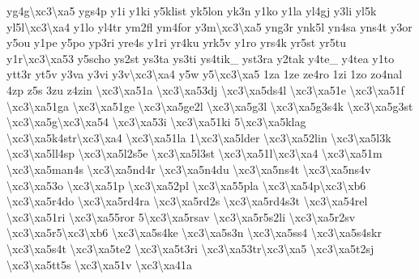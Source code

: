 \begin{DoxyCompactItemize}
yg4g\textbackslash{}xc3\textbackslash{}xa5 ygs4p y1i y1ki y5klist yk5lon yk3n y1ko y1la yl4gj y3li yl5k yl5l\textbackslash{}xc3\textbackslash{}xa4 y1lo yl4tr ym2fl ym4for y3m\textbackslash{}xc3\textbackslash{}xa5 yng3r ynk5l yn4sa yns4t y3or y5ou y1pe y5po yp3ri yre4s y1ri yr4ku yrk5v y1ro yrs4k yr5st yr5tu y1r\textbackslash{}xc3\textbackslash{}xa53 y5scho ys2st ys3ta ys3ti ys4tik\-\_\- yst3ra y2tak y4te\-\_\- y4tea y1to ytt3r yt5v y3va y3vi y3v\textbackslash{}xc3\textbackslash{}xa4 y5w y5\textbackslash{}xc3\textbackslash{}xa5 1za 1ze ze4ro 1zi 1zo zo4nal 4zp z5s 3zu z4zin \textbackslash{}xc3\textbackslash{}xa51a \textbackslash{}xc3\textbackslash{}xa53dj \textbackslash{}xc3\textbackslash{}xa5ds4l \textbackslash{}xc3\textbackslash{}xa51e \textbackslash{}xc3\textbackslash{}xa51f \textbackslash{}xc3\textbackslash{}xa51ga \textbackslash{}xc3\textbackslash{}xa51ge \textbackslash{}xc3\textbackslash{}xa5ge2l \textbackslash{}xc3\textbackslash{}xa5g3l \textbackslash{}xc3\textbackslash{}xa5g3s4k \textbackslash{}xc3\textbackslash{}xa5g3st \textbackslash{}xc3\textbackslash{}xa5g\textbackslash{}xc3\textbackslash{}xa54 \textbackslash{}xc3\textbackslash{}xa53i \textbackslash{}xc3\textbackslash{}xa51ki 5\textbackslash{}xc3\textbackslash{}xa5klag \textbackslash{}xc3\textbackslash{}xa5k4str\textbackslash{}xc3\textbackslash{}xa4 \textbackslash{}xc3\textbackslash{}xa51la 1\textbackslash{}xc3\textbackslash{}xa5lder \textbackslash{}xc3\textbackslash{}xa52lin \textbackslash{}xc3\textbackslash{}xa5l3k \textbackslash{}xc3\textbackslash{}xa5ll4sp \textbackslash{}xc3\textbackslash{}xa5l2s5e \textbackslash{}xc3\textbackslash{}xa5l3st \textbackslash{}xc3\textbackslash{}xa51l\textbackslash{}xc3\textbackslash{}xa4 \textbackslash{}xc3\textbackslash{}xa51m \textbackslash{}xc3\textbackslash{}xa5man4s \textbackslash{}xc3\textbackslash{}xa5nd4r \textbackslash{}xc3\textbackslash{}xa5n4du \textbackslash{}xc3\textbackslash{}xa5ns4t \textbackslash{}xc3\textbackslash{}xa5ns4v \textbackslash{}xc3\textbackslash{}xa53o \textbackslash{}xc3\textbackslash{}xa51p \textbackslash{}xc3\textbackslash{}xa52pl \textbackslash{}xc3\textbackslash{}xa55pla \textbackslash{}xc3\textbackslash{}xa54p\textbackslash{}xc3\textbackslash{}xb6 \textbackslash{}xc3\textbackslash{}xa5r4do \textbackslash{}xc3\textbackslash{}xa5rd4ra \textbackslash{}xc3\textbackslash{}xa5rd2s \textbackslash{}xc3\textbackslash{}xa5rd4s3t \textbackslash{}xc3\textbackslash{}xa54rel \textbackslash{}xc3\textbackslash{}xa51ri \textbackslash{}xc3\textbackslash{}xa55ror 5\textbackslash{}xc3\textbackslash{}xa5rsav \textbackslash{}xc3\textbackslash{}xa5r5s2li \textbackslash{}xc3\textbackslash{}xa5r2sv \textbackslash{}xc3\textbackslash{}xa5r5\textbackslash{}xc3\textbackslash{}xb6 \textbackslash{}xc3\textbackslash{}xa5s4ke \textbackslash{}xc3\textbackslash{}xa5s3n \textbackslash{}xc3\textbackslash{}xa5ss4 \textbackslash{}xc3\textbackslash{}xa5s4skr \textbackslash{}xc3\textbackslash{}xa5s4t \textbackslash{}xc3\textbackslash{}xa5te2 \textbackslash{}xc3\textbackslash{}xa5t3ri \textbackslash{}xc3\textbackslash{}xa53tr\textbackslash{}xc3\textbackslash{}xa5 \textbackslash{}xc3\textbackslash{}xa5t2sj \textbackslash{}xc3\textbackslash{}xa5tt5s \textbackslash{}xc3\textbackslash{}xa51v \textbackslash{}xc3\textbackslash{}xa41a 
\end{DoxyCompactItemize}
